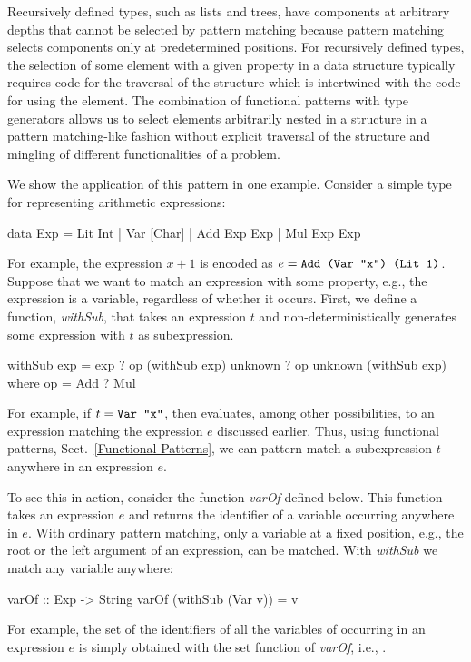 \noindent
Recursively defined
types, such as lists and trees, have components at arbitrary
depths that cannot be selected by pattern matching because pattern
matching selects components only at predetermined positions.  
For recursively defined types, the
selection of some element with a given property in a
data structure typically requires code for the traversal of the
structure which is intertwined with the code for using the element.  The
combination of functional patterns with type generators
allows us to select elements arbitrarily nested in a
structure in a pattern matching-like fashion without
explicit traversal of the structure and mingling of
different functionalities of a problem.

We show the application of this pattern in one example.
Consider a simple type for representing arithmetic
expressions:
%
\begin{prog}
data Exp = Lit Int
         | Var [Char]
         | Add Exp Exp
         | Mul Exp Exp
\end{prog}
%
For example, the expression $x+1$ is encoded as 
$e = \code{Add (Var "x") (Lit 1)}$.
Suppose that we want to match an expression with 
some property, e.g., the expression is a variable,
regardless of whether it occurs.
First, we define a function, \emph{withSub},
that takes an expression $t$
and non-deterministically generates 
some expression with $t$ as subexpression.
%
\begin{prog}
withSub exp = exp
            ? op (withSub exp) unknown
            ? op unknown (withSub exp)
   where op = Add ? Mul  
\end{prog}
%
For example, if $t = \code{Var "x"}$, then
 evaluates, among other possibilities,
to an expression matching the expression $e$ discussed earlier.
Thus, using functional patterns, Sect.~\ref{Functional Patterns},
we can pattern match a subexpression $t$ anywhere in an expression $e$.

To see this in action, consider the function \emph{varOf} defined below.
This function takes an expression $e$ and returns  the identifier
of a variable occurring anywhere in $e$.  With ordinary pattern matching,
only a variable at a fixed position, e.g., the root or the left
argument of an expression, can be matched.  With \emph{withSub} we
match any variable anywhere:
%
\begin{prog}
varOf :: Exp -> String
varOf (withSub (Var v)) = v  
\end{prog}
%
For example, the set of the identifiers of all the variables of
occurring in an expression $e$ is simply obtained with the set function
of \emph{varOf}, i.e., .


